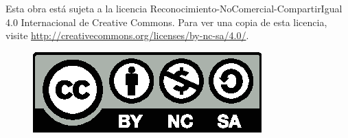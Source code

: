 Esta obra está sujeta a la licencia Reconocimiento-NoComercial-CompartirIgual 4.0 Internacional de Creative Commons. Para ver una copia de esta licencia, visite \url{http://creativecommons.org/licenses/by-nc-sa/4.0/}.
	\begin{figure}[h]
		\centering
		\includegraphics[scale=1]{Graficos/by-nc-sa.eps}
	\end{figure}